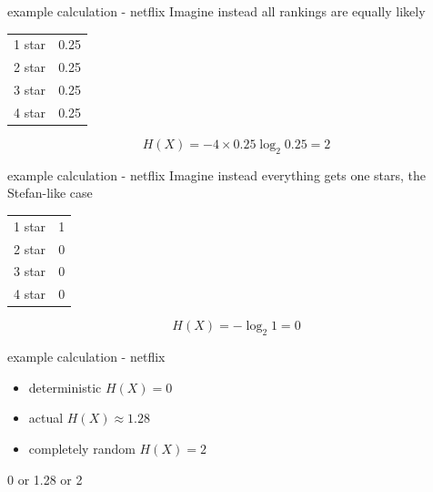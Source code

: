 \documentclass{beamer}
\newcommand{\crish}{\color{reddish}}
\newcommand{\cbla}{\color{black}}
\begin{document}
\begin{frame}{example calculation - netflix}
  Imagine instead all rankings are equally likely
    \begin{center}
    \begin{tabular}{l|l}
      \hline
      1 star&0.25\\
      2 star&0.25\\
      3 star&0.25\\
      4 star&0.25\\
      \hline
    \end{tabular}
  \end{center}
  \crish
  $$
H(X)=-4\times 0.25\log_2{0.25}=2
  $$
\cbla
\end{frame}  
\begin{frame}{example calculation - netflix}
  Imagine instead everything gets one stars, the Stefan-like case
    \begin{center}
    \begin{tabular}{l|l}
      \hline
      1 star&1\\
      2 star&0\\
      3 star&0\\
      4 star&0\\
      \hline
    \end{tabular}
  \end{center}
  \crish
  $$
H(X)=-\log_2{1}=0
  $$
\cbla
\end{frame}
\begin{frame}{example calculation - netflix}
  \begin{itemize}
  \item deterministic \crish $H(X)=0$\cbla
  \item actual \crish $H(X)\approx 1.28$\cbla
  \item completely random \crish $H(X)=2$\cbla
\end{itemize}
\end{frame}
\begin{frame}{0 or 1.28 or 2}
  \begin{center}
  \end{center}
\end{frame}
\end{document}
